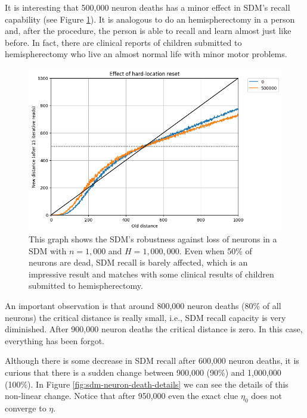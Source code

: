 It is interesting that 500,000 neuron deaths has a minor effect in SDM's recall capability (see Figure \ref{fig:sdm-neuron-death-500k}). It is analogous to do an hemispherectomy in a person and, after the procedure, the person is able to recall and learn almost just like before. In fact, there are clinical reports of children submitted to hemispherectomy who live an almost normal life with minor motor problems.

\begin{figure}[!p]
\centering\includegraphics[width=\textwidth]{./images02/new-images/sdm-neuron-death-500k.png}
\caption{This graph shows the SDM's robustness against loss of neurons in a SDM with $n=1,000$ and $H=1,000,000$. Even when 50\% of neurons are dead, SDM recall is barely affected, which is an impressive result and matches with some clinical results of children submitted to hemispherectomy.
\label{fig:sdm-neuron-death-500k}}
\end{figure}

An important observation is that around 800,000 neuron deaths (80\% of all neurons) the critical distance is really small, i.e., SDM recall capacity is very diminished. After 900,000 neuron deaths the critical distance is zero. In this case, everything has been forgot.

Although there is some decrease in SDM recall after 600,000 neuron deaths, it is curious that there is a sudden change between 900,000 (90\%) and 1,000,000 (100\%). In Figure \ref{fig:sdm-neuron-death-details} we can see the details of this non-linear change. Notice that after 950,000 even the exact clue $\eta_0$ does not converge to $\eta$.

